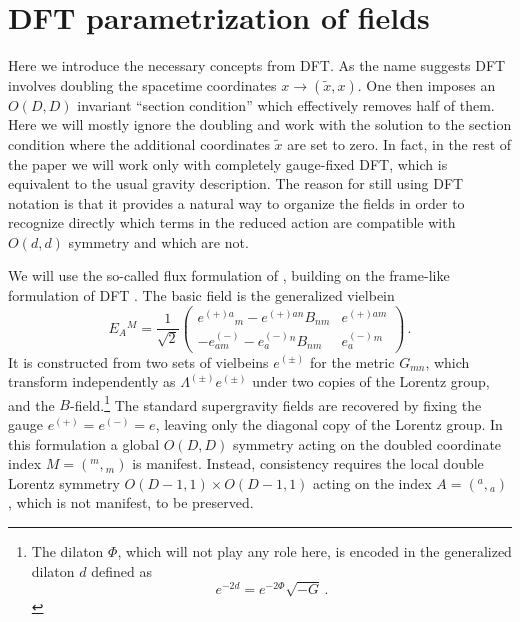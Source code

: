 \documentclass[a4paper,11pt]{article}
\begin{document}
\section{DFT parametrization of fields}\label{sec:DFT}
Here we introduce the necessary concepts from DFT. As the name suggests DFT involves doubling the spacetime coordinates $x\rightarrow (\tilde x,x)$. One then imposes an $O(D,D)$ invariant ``section condition'' which effectively removes half of them. Here we will mostly ignore the doubling and work with the solution to the section condition where the additional coordinates $\tilde x$ are set to zero. In fact, in the rest of the paper we will work only with completely gauge-fixed DFT, which is equivalent to the usual gravity description. The reason for still using DFT notation is that it provides a natural way to organize the fields in order to recognize directly which terms in the reduced action are compatible with $O(d,d)$ symmetry and which are not.

We will use the so-called flux formulation of \cite{Geissbuhler:2013uka}, building on the frame-like formulation of DFT \cite{Hohm:2010xe}. The basic field is the generalized vielbein
\begin{equation}
E_A{}^M=
\frac{1}{\sqrt2}
\left(
\begin{array}{cc}
e^{(+)a}{}_m-e^{(+)an}B_{nm} & e^{(+)am}\\
-e^{(-)}_{am}-e^{(-)}_a{}^nB_{nm} & e^{(-)}_a{}^m
\end{array}
\right)\,.
\label{eq:E}
\end{equation}
It is constructed from two sets of vielbeins $e^{(\pm)}$ for the metric $G_{mn}$, which transform independently as $\Lambda^{(\pm)}e^{(\pm)}$ under two copies of the Lorentz group, and the $B$-field.\footnote{
The dilaton $\Phi$, which will not play any role here, is encoded in the generalized dilaton $d$ defined as
$$
e^{-2d}=e^{-2\Phi}\sqrt{-G}\,.
$$
} The standard supergravity fields are recovered by fixing the gauge $e^{(+)}=e^{(-)}=e$, leaving only the diagonal copy of the Lorentz group. In this formulation a global $O(D,D)$ symmetry acting on the doubled coordinate index $M=({}^m,{}_m)$ is manifest. Instead, consistency requires the local double Lorentz symmetry $O(D-1,1)\times O(D-1,1)$ acting on the index $A=({}^a,{}_a)$, which is not manifest, to be preserved.
\end{document}
